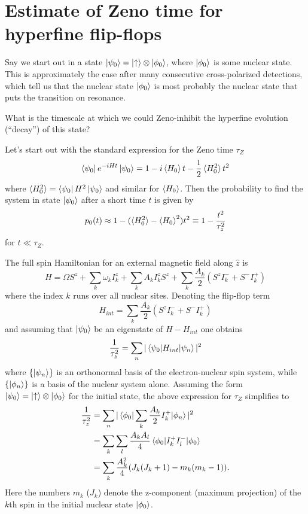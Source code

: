 \documentclass[aps, pra, amsfonts, a4paper, showpacs]{revtex4-1}
\begin{document}
\newcommand{\kpz}{\ket{\psi_0}}
\newcommand{\bpz}{\bra{\psi_0}}
\newcommand{\hz}{\braket{H_0}}
\newcommand{\hsqz}{\braket{H^2_0}}
\newcommand{\heff}{H_{\mathrm{eff}}}

\section*{Estimate of Zeno time for hyperfine flip-flops}
Say we start out in a state $\ket{\psi_0}=\ket{\uparrow}\otimes\ket{\phi_0}$, where $\ket{\phi_0}$ is some nuclear state. This is approximately the case after many consecutive cross-polarized detections, which tell us that the nuclear state $\ket{\phi_0}$ is most probably the nuclear state that puts the transition on resonance. 

What is the timescale at which we could Zeno-inhibit the hyperfine evolution (``decay'') of this state? 

\vspace{0.5cm}
Let's start out with the standard expression for the Zeno time $\tau_Z$ \cite{pascazio_all_2014}
\[
\bpz e^{-i H t} \kpz = 1 - i\hz t -\frac{1}{2} \hsqz t^2
\]
where $ \hsqz = \bpz  H^2 \kpz$ and similar for $\hz$.
Then the probability to find the system in state $\kpz$ after a short time $t$ is given by
\begin{equation}
p_0(t) \approx 1- (\hsqz - \hz^2)t^2 \equiv 1- \frac{t^2}{\tau_z^2} 
\label{Eq: p0}
\end{equation}
for $t \ll \tau_Z$.

The full spin Hamiltonian for an external magnetic field along $\hat{z}$ is
\begin{equation}
H=\Omega S^z + \sum_k \omega_k I^z_k + \sum_k A_k I^z_k S^z + \sum_k \frac{A_k}{2}(S^zI^-_k + S^- I_k^+)
\label{Eq: H}
\end{equation}
where the index $k$ runs over all nuclear sites. Denoting the flip-flop term
\[H_{int} = \sum_k \frac{A_k}{2}(S^zI^-_k + S^- I_k^+) \]
and assuming that $\kpz$ be an eigenstate of $H-H_{int}$ one obtains
\begin{equation}
\frac{1}{\tau_z^2} = \sum_n |\braket{\psi_0|H_{int}|\psi_n}|^2
\label{Eq: simp}
\end{equation}
where $\{\ket{\psi_n}\}$ is an orthonormal basis of the electron-nuclear spin system, while $\{\ket{\phi_n}\}$ is a basis of the nuclear system alone.
Assuming the form $\ket{\psi_0}=\ket{\uparrow}\otimes\ket{\phi_0}$ for the initial state, the above expression for $\tau_Z$ simplifies to
\begin{equation}
\begin{split}
\frac{1}{\tau_z^2} &=\sum_n |\braket{\phi_0 | \sum_k \frac{A_k}{2} I_k^+ |\phi_n}|^2 \\
&= \sum_k \sum_l \frac{A_k A_l}{4}\braket{\phi_0 | I_k^+ I_l^- |\phi_0} \\
&= \sum_k \frac{A_k^2}{4}(J_k(J_k+1) - m_k(m_k -1)).
\end{split}
\end{equation}
Here the numbers $m_k$ ($J_k$) denote the z-component (maximum projection) of the $k$th spin in the initial nuclear state $\ket{\phi_0}$.
\end{document}
